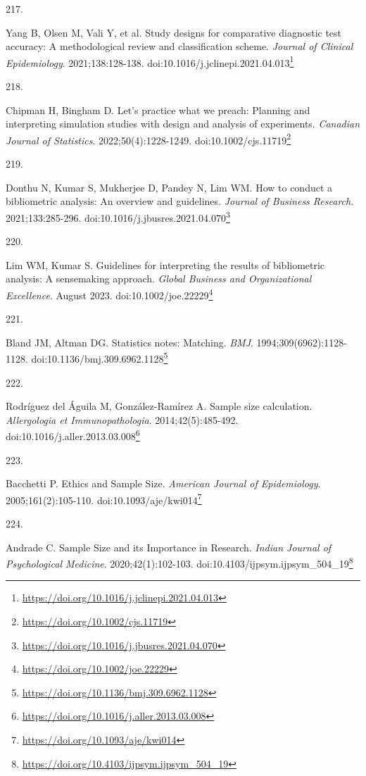 \documentclass[
  a4paper,
]{book}
\newlength{\cslhangindent}
\newlength{\csllabelwidth}
\newlength{\cslentryspacingunit} %
\newenvironment{CSLReferences}[2] %
 {%
  \setlength{\parindent}{0pt}
  \ifodd #1
  \let\oldpar\par
  \def\par{\hangindent=\cslhangindent\oldpar}
  \fi
  \setlength{\parskip}{#2\cslentryspacingunit}
 }%
 {}
\newcommand{\CSLLeftMargin}[1]{\parbox[t]{\csllabelwidth}{#1}}
\newcommand{\CSLRightInline}[1]{\parbox[t]{\linewidth - \csllabelwidth}{#1}\break}
\renewcommand{\href}[2]{#2\footnote{\url{#1}}}
\begin{document}
\begin{CSLReferences}{0}{0}
\leavevmode{}%
\CSLLeftMargin{217. }%
\CSLRightInline{Yang B, Olsen M, Vali Y, et al. Study designs for comparative diagnostic test accuracy: A methodological review and classification scheme. \emph{Journal of Clinical Epidemiology}. 2021;138:128-138. doi:\href{https://doi.org/10.1016/j.jclinepi.2021.04.013}{10.1016/j.jclinepi.2021.04.013}}

\leavevmode{}%
\CSLLeftMargin{218. }%
\CSLRightInline{Chipman H, Bingham D. Let's practice what we preach: Planning and interpreting simulation studies with design and analysis of experiments. \emph{Canadian Journal of Statistics}. 2022;50(4):1228-1249. doi:\href{https://doi.org/10.1002/cjs.11719}{10.1002/cjs.11719}}

\leavevmode{}%
\CSLLeftMargin{219. }%
\CSLRightInline{Donthu N, Kumar S, Mukherjee D, Pandey N, Lim WM. How to conduct a bibliometric analysis: An overview and guidelines. \emph{Journal of Business Research}. 2021;133:285-296. doi:\href{https://doi.org/10.1016/j.jbusres.2021.04.070}{10.1016/j.jbusres.2021.04.070}}

\leavevmode{}%
\CSLLeftMargin{220. }%
\CSLRightInline{Lim WM, Kumar S. Guidelines for interpreting the results of bibliometric analysis: A sensemaking approach. \emph{Global Business and Organizational Excellence}. August 2023. doi:\href{https://doi.org/10.1002/joe.22229}{10.1002/joe.22229}}

\leavevmode{}%
\CSLLeftMargin{221. }%
\CSLRightInline{Bland JM, Altman DG. Statistics notes: Matching. \emph{BMJ}. 1994;309(6962):1128-1128. doi:\href{https://doi.org/10.1136/bmj.309.6962.1128}{10.1136/bmj.309.6962.1128}}

\leavevmode{}%
\CSLLeftMargin{222. }%
\CSLRightInline{Rodríguez del Águila M, González-Ramírez A. Sample size calculation. \emph{Allergologia et Immunopathologia}. 2014;42(5):485-492. doi:\href{https://doi.org/10.1016/j.aller.2013.03.008}{10.1016/j.aller.2013.03.008}}

\leavevmode{}%
\CSLLeftMargin{223. }%
\CSLRightInline{Bacchetti P. Ethics and Sample Size. \emph{American Journal of Epidemiology}. 2005;161(2):105-110. doi:\href{https://doi.org/10.1093/aje/kwi014}{10.1093/aje/kwi014}}

\leavevmode{}%
\CSLLeftMargin{224. }%
\CSLRightInline{Andrade C. Sample Size and its Importance in Research. \emph{Indian Journal of Psychological Medicine}. 2020;42(1):102-103. doi:\href{https://doi.org/10.4103/ijpsym.ijpsym_504_19}{10.4103/ijpsym.ijpsym\_504\_19}}


\end{CSLReferences}
\end{document}
